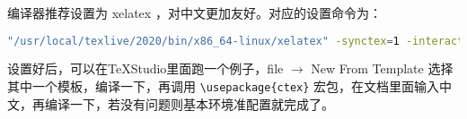 编译器推荐设置为 xelatex ，对中文更加友好。对应的设置命令为：
\begin{lstlisting}[language=bash]
"/usr/local/texlive/2020/bin/x86_64-linux/xelatex" -synctex=1 -interaction=nonstopmode --shell-escape %.tex
\end{lstlisting}

设置好后，可以在TeXStudio里面跑一个例子，file $ \rightarrow $ New From Template 选择其中一个模板，编译一下，再调用  \lstinline|\usepackage{ctex}|  宏包，在文档里面输入中文，再编译一下，若没有问题则基本环境准配置就完成了。





